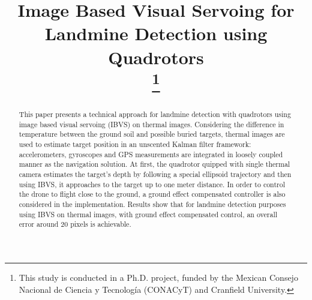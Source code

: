 \documentclass[conference]{IEEEtran}
\begin{document}
\title{Image Based Visual Servoing for Landmine Detection using Quadrotors\\
\thanks{This study is conducted in a Ph.D. project, funded by the Mexican Consejo Nacional de Ciencia y Tecnología (CONACyT) and Cranfield University.}
}

\author{
\and
{}
\and
{}
}

\maketitle

\begin{abstract}
This paper presents a technical approach for landmine detection with quadrotors using image based visual servoing (IBVS) on thermal images. Considering the difference in temperature between the ground soil and possible buried targets, thermal images are used to estimate target position in an unscented Kalman filter framework: accelerometers, gyroscopes and GPS measurements are integrated in loosely coupled manner as the navigation solution. At first, the quadrotor quipped with single thermal camera estimates the target's depth by following a special ellipsoid trajectory and then using IBVS, it approaches to the target up to one meter distance. In order to control the drone to flight close to the ground, a ground effect compensated controller is also considered in the implementation. Results show that for landmine detection purposes using IBVS on thermal images, with ground effect compensated control, an overall error around 20 pixels is achievable. 
\end{abstract}
\end{document}
